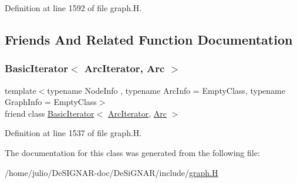 Definition at line 1592 of file graph.\+H.



\subsection{Friends And Related Function Documentation}
\mbox{\label{class_designar_1_1_graph_1_1_arc_iterator_a530ad7c7218fa9b74a5cce004d0e3a1c}} 
\subsubsection{\texorpdfstring{Basic\+Iterator$<$ Arc\+Iterator, Arc $>$}{BasicIterator< ArcIterator, Arc >}}
{\footnotesize\ttfamily template$<$typename Node\+Info , typename Arc\+Info  = Empty\+Class, typename Graph\+Info  = Empty\+Class$>$ \\
friend class \hyperlink{class_designar_1_1_basic_iterator}{Basic\+Iterator}$<$ \hyperlink{class_designar_1_1_graph_1_1_arc_iterator}{Arc\+Iterator}, \hyperlink{class_designar_1_1_graph_a74c730ef4ce2d20f998d72bd25c2b5bf}{Arc} $>$\hspace{0.3cm}{\ttfamily [friend]}}



Definition at line 1537 of file graph.\+H.



The documentation for this class was generated from the following file\+:\begin{DoxyCompactItemize}
\item 
/home/julio/\+De\+S\+I\+G\+N\+A\+R-\/doc/\+De\+Si\+G\+N\+A\+R/include/\hyperlink{graph_8_h}{graph.\+H}\end{DoxyCompactItemize}
